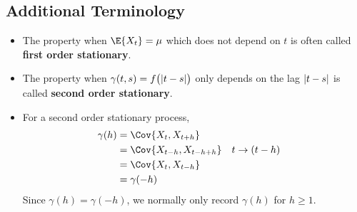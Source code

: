 \subsection*{Additional Terminology}
\begin{itemize}
    \item The property when $ \E{X_t}=\mu $ which does not depend
          on $ t $ is often called \textbf{first order stationary}.
    \item The property when $ \gamma(t,s)=f\bigl(\lvert t-s\rvert\bigr) $
          only depends on the lag $ \lvert t-s\rvert $ is called
          \textbf{second order stationary}.
    \item For a second order stationary process,
          \begin{align*}
              \gamma(h)
               & =\Cov{X_t,X_{t+h}}                                 \\
               & =\Cov{X_{t-h},X_{t-h+h}} &  & t\rightarrow{} (t-h) \\
               & =\Cov{X_t,X_{t-h}}                                 \\
               & =\gamma(-h)
          \end{align*}
          Since $ \gamma(h)=\gamma(-h) $, we
          normally only record $ \gamma(h) $ for $ h\ge 1 $.
\end{itemize}

